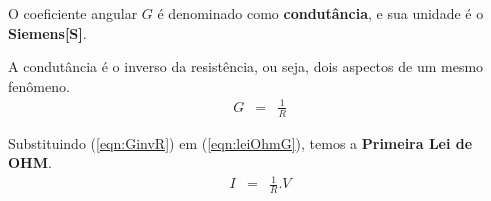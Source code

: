O coeficiente angular $G$ é denominado como \textbf{condutância}, e sua unidade é o \textbf{Siemens[S]}.

A condutância é o inverso da resistência, ou seja, dois aspectos de um mesmo fenômeno.
\vspace{-3mm}
\begin{eqnarray}
  \label{eqn:GinvR}
  G & = & \frac{1}{R}
\end{eqnarray}

Substituindo (\ref{eqn:GinvR}) em (\ref{eqn:leiOhmG}), temos a \textbf{Primeira Lei de OHM}.
\vspace{-3mm}
\begin{eqnarray}
  \label{eqn:leiOhmR}
  I & = & \frac{1}{R} . V
\end{eqnarray}
